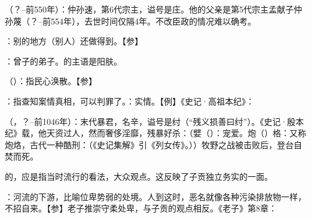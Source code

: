 {
\item {}（？--前550年）：仲孙速，第6代宗主，谥号是庄。他的父亲是第5代宗主孟献子仲孙蔑（？--前554年），去世时间仅隔4年。不改臣政的情况难以确考。
\item {}：别的地方（别人）还做得到。【参】
}
{}


{
\item {}：曾子的弟子。的主语是阳肤。
\item {}（）：指民心涣散。【参】 
\item {}：指查知案情真相，可以判罪了。：实情。【例】《史记·高祖本纪》：
}
{} %


{
\item {}（，？--前1046年）：末代暴君，名辛，谥号是纣（“残义损善曰纣”）。《史记·殷本纪》载，他天资过人，然而奢侈淫靡，残暴好杀：（嬖（）：宠爱。炮（）格：又称炮烙，古代一种酷刑：（《史记集解》引《列女传》。））牧野之战被击败后，登台自焚而死。
\item {}的，应是指当时流行的看法，大众观点。这反映了子贡独立务实的一面。
\item {}：河流的下游，比喻位卑势弱的处境。人到这时，恶名就像各种污染排放物一样，不招自来。【参】老子推崇守柔处卑，与子贡的观点相反。《老子》第8章：
}
{}  %



